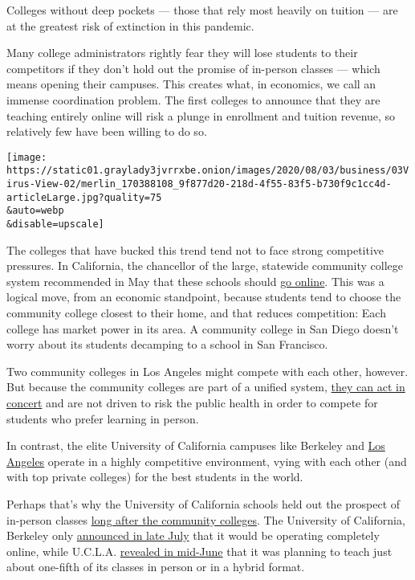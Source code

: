 Colleges without deep pockets --- those that rely most heavily on
tuition --- are at the greatest risk of extinction in this pandemic.

Many college administrators rightly fear they will lose students to
their competitors if they don't hold out the promise of in-person
classes --- which means opening their campuses. This creates what, in
economics, we call an immense coordination problem. The first colleges
to announce that they are teaching entirely online will risk a plunge in
enrollment and tuition revenue, so relatively few have been willing to
do so.

\texttt{[image: https://static01.graylady3jvrrxbe.onion/images/2020/08/03/business/03Virus-View-02/merlin\_170388108\_9f877d20-218d-4f55-83f5-b730f9c1cc4d-articleLarge.jpg?quality=75\\\&auto=webp\\\&disable=upscale]}

The colleges that have bucked this trend tend not to face strong
competitive pressures. In California, the chancellor of the large,
statewide community college system recommended in May that these schools
should
\href{https://www.cbs8.com/article/news/local/california/california-community-college-chancellor-endorses-going-online-only-this-fall/509-bab87578-c4be-4f25-bce7-58bdecf57c90}{go
online}. This was a logical move, from an economic standpoint, because
students tend to choose the community college closest to their home, and
that reduces competition: Each college has market power in its area. A
community college in San Diego doesn't worry about its students
decamping to a school in San Francisco.

Two community colleges in Los Angeles might compete with each other,
however. But because the community colleges are part of a unified
system,
\href{https://edsource.org/2020/some-california-colleges-decide-to-offer-all-fall-classes-online/630660}{they
can act in concert} and are not driven to risk the public health in
order to compete for students who prefer learning in person.

In contrast, the elite University of California campuses like Berkeley
and \href{https://www.ucla.edu/}{Los Angeles} operate in a highly
competitive environment, vying with each other (and with top private
colleges) for the best students in the world.

Perhaps that's why the University of California schools held out the
prospect of in-person classes
\href{https://www.sacbee.com/news/politics-government/capitol-alert/article244116777.html}{long
after the community colleges}. The University of California, Berkeley
only
\href{https://www.berkeleyside.com/2020/07/21/uc-berkeley-online-covid-19-fall-semester}{announced
in late July} that it would be operating completely online, while
U.C.L.A.
\href{https://newsroom.ucla.edu/releases/preparations-for-the-2020-21-academic-year}{revealed
in mid-June} that it was planning to teach just about one-fifth of its
classes in person or in a hybrid format.

